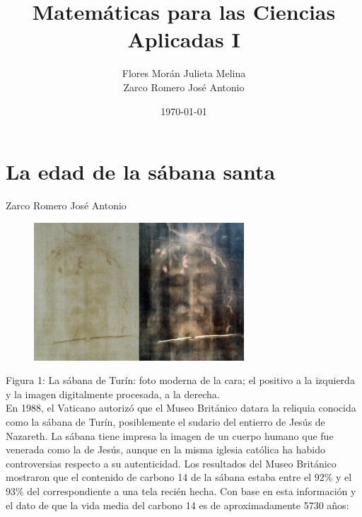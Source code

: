 \documentclass[12pt]{article}
\title{Matemáticas para las Ciencias Aplicadas I}
\date{\today}
\author{Flores Morán Julieta Melina \\ Zarco Romero José Antonio}
\begin{document}
\maketitle

\section{La edad de la sábana santa}
Zarco Romero José Antonio\\

\begin{figure}[h]
\centering
\includegraphics[width=0.7\textwidth]{img/sabanaSanta.png}
\end{figure}
Figura 1: La sábana de Turín: foto moderna de la cara; el positivo a la izquierda y la imagen digitalmente procesada, a la derecha.\\

En 1988, el Vaticano autorizó que el Museo Británico datara la reliquia conocida como la sábana de Turín, posiblemente el sudario del entierro de Jesús de Nazareth. La sábana tiene impresa la imagen de un cuerpo humano que fue venerada como la de Jesús, aunque en la misma iglesia católica ha habido controversias respecto a su autenticidad. Los resultados del Museo Británico mostraron que el contenido de carbono 14 de la sábana estaba entre el $92 \%$ y el $93 \%$ del correspondiente a una tela recién hecha. Con base en esta información y el dato de que la vida media del carbono 14 es de aproximadamente 5730 años:
\end{document}
